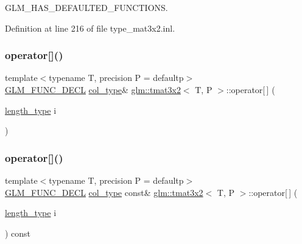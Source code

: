 G\+L\+M\+\_\+\+H\+A\+S\+\_\+\+D\+E\+F\+A\+U\+L\+T\+E\+D\+\_\+\+F\+U\+N\+C\+T\+I\+O\+NS. 



Definition at line 216 of file type\+\_\+mat3x2.\+inl.

\mbox{\label{structglm_1_1tmat3x2_a7bf6dec8837ea7b18163629c1fdf60bb}} 
\subsubsection{\texorpdfstring{operator[]()}{operator[]()}\hspace{0.1cm}{\footnotesize\ttfamily [1/2]}}
{\footnotesize\ttfamily template$<$typename T, precision P = defaultp$>$ \\
\mbox{\hyperlink{setup_8hpp_ab2d052de21a70539923e9bcbf6e83a51}{G\+L\+M\+\_\+\+F\+U\+N\+C\+\_\+\+D\+E\+CL}} \mbox{\hyperlink{structglm_1_1tmat3x2_a341f5be67463bce97692bc232312b7e8}{col\+\_\+type}}\& \mbox{\hyperlink{structglm_1_1tmat3x2}{glm\+::tmat3x2}}$<$ T, P $>$\+::operator\mbox{[}$\,$\mbox{]} (\begin{DoxyParamCaption}\item[{\mbox{\hyperlink{structglm_1_1tmat3x2_a358b949a615ed48c4dc18c53a55358df}{length\+\_\+type}}}]{i }\end{DoxyParamCaption})}

\mbox{\label{structglm_1_1tmat3x2_a870e0f36a2588eb7e739aa52a2302279}} 
\subsubsection{\texorpdfstring{operator[]()}{operator[]()}\hspace{0.1cm}{\footnotesize\ttfamily [2/2]}}
{\footnotesize\ttfamily template$<$typename T, precision P = defaultp$>$ \\
\mbox{\hyperlink{setup_8hpp_ab2d052de21a70539923e9bcbf6e83a51}{G\+L\+M\+\_\+\+F\+U\+N\+C\+\_\+\+D\+E\+CL}} \mbox{\hyperlink{structglm_1_1tmat3x2_a341f5be67463bce97692bc232312b7e8}{col\+\_\+type}} const\& \mbox{\hyperlink{structglm_1_1tmat3x2}{glm\+::tmat3x2}}$<$ T, P $>$\+::operator\mbox{[}$\,$\mbox{]} (\begin{DoxyParamCaption}\item[{\mbox{\hyperlink{structglm_1_1tmat3x2_a358b949a615ed48c4dc18c53a55358df}{length\+\_\+type}}}]{i }\end{DoxyParamCaption}) const}



